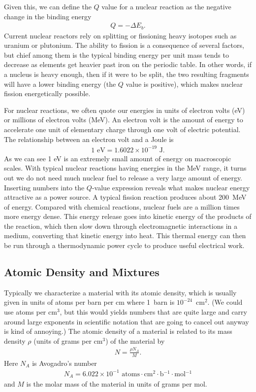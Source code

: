 Given this, we can define the $Q$ value for a nuclear reaction as the negative change in the binding energy
\begin{align}
  Q = -\Delta E_b.
\end{align}
Current nuclear reactors rely on splitting or fissioning heavy isotopes such as uranium or plutonium. The ability to fission is a consequence of several factors, but chief among them is the typical binding energy per unit mass tends to decrease as elements get heavier past iron on the periodic table. In other words, if a nucleus is heavy enough, then if it were to be split, the two resulting fragments will have a lower binding energy (the $Q$ value is positive), which makes nuclear fission energetically possible. 

For nuclear reactions, we often quote our energies in units of electron volts (eV) or millions of electron volts (MeV). An electron volt is the amount of energy to accelerate one unit of elementary charge through one volt of electric potential. The relationship between an electron volt and a Joule is
\begin{align}
  1 \text{ eV} = 1.6022 \times 10^{-19} \text{ J}. \nonumber
\end{align}
As we can see 1 eV is an extremely small amount of energy on macroscopic scales. With typical nuclear reactions having energies in the MeV range, it turns out we do not need much nuclear fuel to release a very large amount of energy. Inserting numbers into the $Q$-value expression reveals what makes nuclear energy attractive as a power source. A typical fission reaction produces about 200~MeV of energy. Compared with chemical reactions, nuclear fuels are a million times more energy dense. This energy release goes into kinetic energy of the products of the reaction, which then slow down through electromagnetic interactions in a medium, converting that kinetic energy into heat. This thermal energy can then be run through a thermodynamic power cycle to produce useful electrical work.

\subsection{Atomic Density and Mixtures}

Typically we characterize a material with its atomic density, which is usually given in units of atoms per barn per cm where 1~barn is $10^{-24}$~cm$^2$. (We could use atoms per cm$^3$, but this would yields numbers that are quite large and carry around large exponents in scientific notation that are going to cancel out anyway is kind of annoying.) The atomic density of a material is related to its mass density $\rho$ (units of grams per cm$^3$) of the material by
\begin{align}
  N = \frac{\rho N_A}{M}.
\end{align}
Here $N_A$ is Avogadro's number
\begin{align}
  N_A = 6.022 \times 10^{-1} \text{ atoms$\cdot$cm$^2$$\cdot$b$^{-1}$$\cdot$mol$^{-1}$} \nonumber
\end{align}
and $M$ is the molar mass of the material in units of grams per mol.

